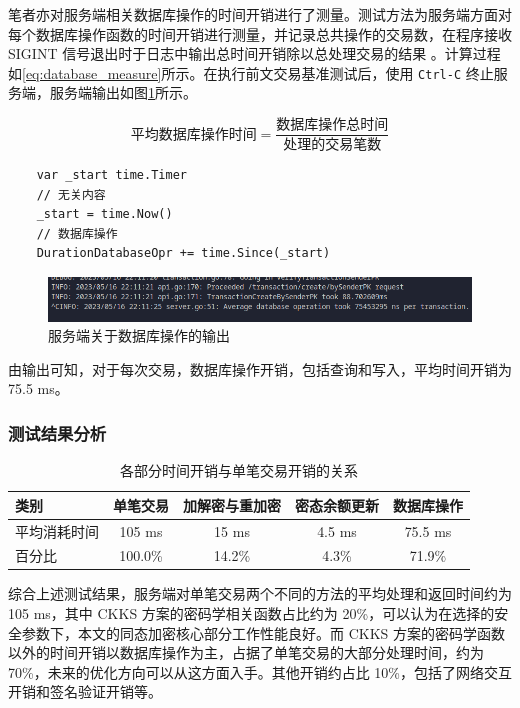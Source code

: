笔者亦对服务端相关数据库操作的时间开销进行了测量。测试方法为服务端方面对每个数据库操作函数的时间开销进行测量，并记录总共操作的交易数，在程序接收 SIGINT 信号退出时于日志中输出总时间开销除以总处理交易的结果 。计算过程如\eqref{eq:database_measure}所示。在执行前文交易基准测试后，使用 \texttt{Ctrl-C} 终止服务端，服务端输出如图\ref{Fig:bench_database_perf}所示。

\begin{equation} \label{eq:database_measure}
    \textrm{平均数据库操作时间} = \frac{\textrm{数据库操作总时间}}{\textrm{处理的交易笔数}}
\end{equation}

\begin{verbatim}
    var _start time.Timer
    // 无关内容
    _start = time.Now()
    // 数据库操作
    DurationDatabaseOpr += time.Since(_start)
\end{verbatim}

\begin{figure}[h]
    \centering
    \includegraphics[width=0.8\linewidth]{./Figures/Test_Database_Perf.png}
    \caption{服务端关于数据库操作的输出} \label{Fig:bench_database_perf}
\end{figure}

由输出可知，对于每次交易，数据库操作开销，包括查询和写入，平均时间开销为 75.5 ms。

\subsubsection{测试结果分析}

\begin{table}[h]
    \begin{tabular}{|l|c|c|c|c|}
        \hline
        类别 & 单笔交易 & 加解密与重加密 & 密态余额更新 & 数据库操作 \\
        \hline
        平均消耗时间 & 105 ms & 15 ms & 4.5 ms & 75.5 ms \\ 
        \hline
        百分比 & 100.0\% & 14.2\% & 4.3\% & 71.9\% \\
        \hline
    \end{tabular}
    \caption{各部分时间开销与单笔交易开销的关系} \label{Tab:time_comsumption}
\end{table}

综合上述测试结果，服务端对单笔交易两个不同的方法的平均处理和返回时间约为 105 ms，其中 CKKS 方案的密码学相关函数占比约为 20\%，可以认为在选择的安全参数下，本文的同态加密核心部分工作性能良好。而 CKKS 方案的密码学函数以外的时间开销以数据库操作为主，占据了单笔交易的大部分处理时间，约为 70\%，未来的优化方向可以从这方面入手。其他开销约占比 10\%，包括了网络交互开销和签名验证开销等。


